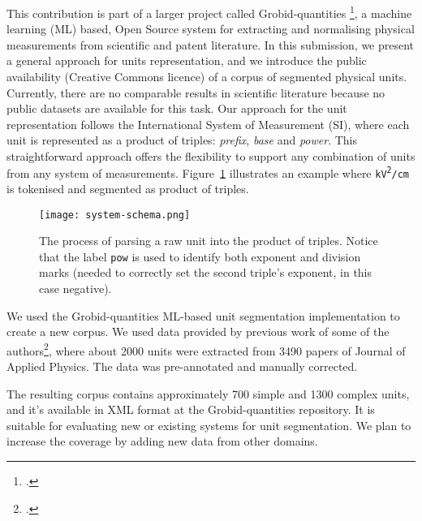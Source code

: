 \documentclass[a4paper,11pt]{article}
\begin{document}
This contribution is part of a larger project called Grobid-quantities \footcite{grobid-quantities}, a machine learning (ML) based, Open Source system for extracting and normalising physical measurements from scientific and patent literature. 
In this submission, we present a general approach for units representation, and we introduce the public availability (Creative Commons licence) of a corpus of segmented physical units. 
Currently, there are no comparable results in scientific literature because no public datasets are available for this task.
Our approach for the unit representation follows the International System of Measurement (SI), where each unit is represented as a product of triples: \textit{prefix}, \textit{base} and \textit{power}. This straightforward approach offers the flexibility to support any combination of units from any system of measurements. 
Figure~\ref{fig:dataset example} illustrates an example where \texttt{kV\textsuperscript{2}/cm} is tokenised and segmented as product of triples.
\begin{figure}[h]
    \centering
    \texttt{[image: system-schema.png]}
    \caption[] {The process of parsing a raw unit into the product of triples. Notice that the label \texttt{pow} is used to identify both exponent and division marks (needed to correctly set the second triple's exponent, in this case negative).}
    \label{fig:dataset example}
\end{figure}

We used the Grobid-quantities ML-based unit segmentation implementation to create a new corpus. We used data provided by previous work of some of the authors\footcite{suzuki2018constructing}, where about 2000 units were extracted from 3490 papers of Journal of Applied Physics. The data was pre-annotated and manually corrected. 

The resulting corpus contains approximately 700 simple and 1300 complex units, and it's available in XML format at the Grobid-quantities repository\footnotemark[3]. It is suitable for evaluating new or existing systems for unit segmentation. We plan to increase the coverage by adding new data from other domains.
\end{document}
